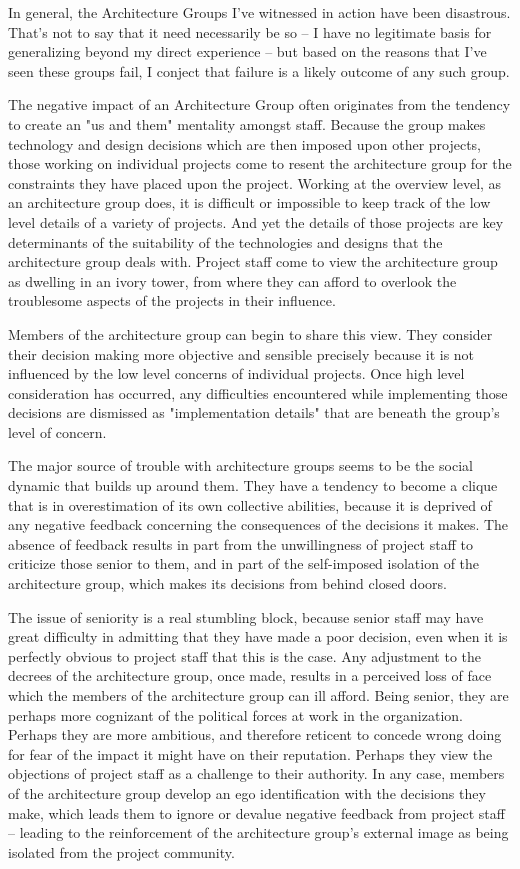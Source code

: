 \documentclass{article}
\begin{document}
In general, the Architecture Groups I've witnessed in action have been
disastrous. That's not to say that it need necessarily be so -- I have
no legitimate basis for generalizing beyond my direct experience -- but
based on the reasons that I've seen these groups fail, I conject that
failure is a likely outcome of any such group.

The negative impact of an Architecture Group often originates from the
tendency to create an "us and them" mentality amongst staff. Because the
group makes technology and design decisions which are then imposed upon
other projects, those working on individual projects come to resent the
architecture group for the constraints they have placed upon the
project. Working at the overview level, as an architecture group does,
it is difficult or impossible to keep track of the low level details of
a variety of projects. And yet the details of those projects are key
determinants of the suitability of the technologies and designs that the
architecture group deals with. Project staff come to view the
architecture group as dwelling in an ivory tower, from where they can
afford to overlook the troublesome aspects of the projects in their
influence.

Members of the architecture group can begin to share this view. They
consider their decision making more objective and sensible precisely
because it is not influenced by the low level concerns of individual
projects. Once high level consideration has occurred, any difficulties
encountered while implementing those decisions are dismissed as
"implementation details" that are beneath the group's level of concern.

The major source of trouble with architecture groups seems to be the
social dynamic that builds up around them. They have a tendency to
become a clique that is in overestimation of its own collective
abilities, because it is deprived of any negative feedback concerning
the consequences of the decisions it makes. The absence of feedback
results in part from the unwillingness of project staff to criticize
those senior to them, and in part of the self-imposed isolation of the
architecture group, which makes its decisions from behind closed doors.

The issue of seniority is a real stumbling block, because senior staff
may have great difficulty in admitting that they have made a poor
decision, even when it is perfectly obvious to project staff that this
is the case. Any adjustment to the decrees of the architecture group,
once made, results in a perceived loss of face which the members of the
architecture group can ill afford. Being senior, they are perhaps more
cognizant of the political forces at work in the organization. Perhaps
they are more ambitious, and therefore reticent to concede wrong doing
for fear of the impact it might have on their reputation. Perhaps they
view the objections of project staff as a challenge to their authority.
In any case, members of the architecture group develop an ego
identification with the decisions they make, which leads them to ignore
or devalue negative feedback from project staff -- leading to the
reinforcement of the architecture group's external image as being
isolated from the project community.
\end{document}
